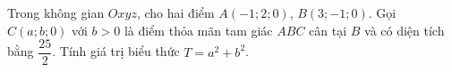 \begin{ex}
Trong không gian $Oxyz$, cho hai điểm $A(-1;2;0)$, $B(3;-1;0)$. Gọi $C(a;b;0)$ với $b>0$ là điểm thỏa mãn tam giác $ABC$ cân tại $B$ và có diện tích bằng $\dfrac{25}2$. Tính giá trị biểu thức $T=a^2+b^2$.
\end{ex}
